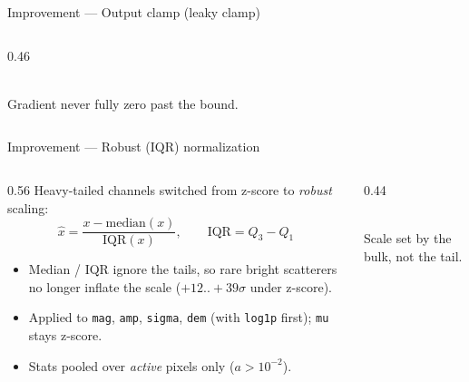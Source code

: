 \documentclass[aspectratio=169,10pt]{beamer}
\begin{document}
\begin{frame}{Improvement --- Output clamp (leaky clamp)}
\begin{columns}[T]
\begin{column}{0.46\textwidth}
      \centering
      \\[-2pt]
      {\scriptsize Gradient never fully zero past the bound.}
    \end{column}
  \end{columns}
\end{frame}

\begin{frame}{Improvement --- Robust (IQR) normalization}
  \begin{columns}[T]
    \begin{column}{0.56\textwidth}
      \small
      Heavy-tailed channels switched from z-score to \emph{robust} scaling:
      \[
        \hat x=\frac{x-\mathrm{median}(x)}{\mathrm{IQR}(x)},\qquad
        \mathrm{IQR}=Q_3-Q_1
      \]
      \begin{itemize}\scriptsize
        \item Median / IQR ignore the tails, so rare bright scatterers no
              longer inflate the scale ($+12..+39\sigma$ under z-score).
        \item Applied to \texttt{mag}, \texttt{amp}, \texttt{sigma}, \texttt{dem}
              (with \texttt{log1p} first); \texttt{mu} stays z-score.
        \item Stats pooled over \emph{active} pixels only ($a>10^{-2}$).
      \end{itemize}
    \end{column}
    \begin{column}{0.44\textwidth}
      \centering
      \\[-2pt]
      {\scriptsize Scale set by the bulk, not the tail.}
    \end{column}
  \end{columns}
\end{frame}
\end{document}

